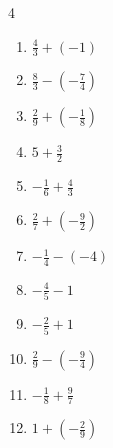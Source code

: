 \begin{multicols}{4}
\begin{enumerate}
  \item $\displaystyle \frac{4}{3} + \left(-1\right)$


  \item $\displaystyle \frac{8}{3} - \left(-\frac{7}{4}\right)$


  \item $\displaystyle \frac{2}{9} + \left(-\frac{1}{8}\right)$


  \item $\displaystyle 5 + \frac{3}{2}$


  \item $\displaystyle -\frac{1}{6} + \frac{4}{3}$


  \item $\displaystyle \frac{2}{7} + \left(-\frac{9}{2}\right)$


  \item $\displaystyle -\frac{1}{4} - \left(-4\right)$


  \item $\displaystyle -\frac{4}{5} - 1$


  \item $\displaystyle -\frac{2}{5} + 1$


  \item $\displaystyle \frac{2}{9} - \left(-\frac{9}{4}\right)$


\columnbreak %

\resetques

  \item $\displaystyle -\frac{1}{8} + \frac{9}{7}$


  \item $\displaystyle 1 + \left(-\frac{2}{9}\right)$


\end{enumerate}
\end{multicols}
